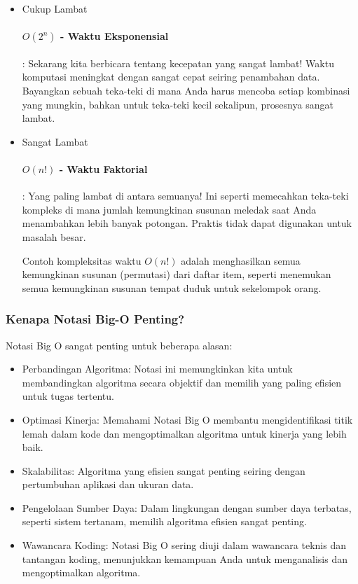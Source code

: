 \documentclass{article}
\begin{document}
\begin{itemize}
          \paragraph{\(O(n^2)\) - Waktu Kuadrat}: Semakin lambat seiring penambahan data. Seperti memeriksa setiap kombinasi item dalam daftar satu sama lain, tidak ideal untuk daftar besar.
    \item Cukup Lambat


          \paragraph{\(O(2^n)\) - Waktu Eksponensial}: Sekarang kita berbicara tentang kecepatan yang sangat lambat! Waktu komputasi meningkat dengan sangat cepat seiring penambahan data. Bayangkan sebuah teka-teki di mana Anda harus mencoba setiap kombinasi yang mungkin, bahkan untuk teka-teki kecil sekalipun, prosesnya sangat lambat.
    \item Sangat Lambat

          \paragraph{\(O(n!)\) - Waktu Faktorial}: Yang paling lambat di antara semuanya! Ini seperti memecahkan teka-teki kompleks di mana jumlah kemungkinan susunan meledak saat Anda menambahkan lebih banyak potongan. Praktis tidak dapat digunakan untuk masalah besar.

          Contoh kompleksitas waktu \(O(n!)\) adalah menghasilkan semua kemungkinan susunan (permutasi) dari daftar item, seperti menemukan semua kemungkinan susunan tempat duduk untuk sekelompok orang.
\end{itemize}

\subsubsection{Kenapa Notasi Big-O Penting?}
Notasi Big O sangat penting untuk beberapa alasan:
\begin{itemize}
    \item Perbandingan Algoritma: Notasi ini memungkinkan kita untuk membandingkan algoritma secara objektif dan memilih yang paling efisien untuk tugas tertentu.
    \item Optimasi Kinerja: Memahami Notasi Big O membantu mengidentifikasi titik lemah dalam kode dan mengoptimalkan algoritma untuk kinerja yang lebih baik.
    \item Skalabilitas: Algoritma yang efisien sangat penting seiring dengan pertumbuhan aplikasi dan ukuran data.
    \item Pengelolaan Sumber Daya: Dalam lingkungan dengan sumber daya terbatas, seperti sistem tertanam, memilih algoritma efisien sangat penting.
    \item Wawancara Koding: Notasi Big O sering diuji dalam wawancara teknis dan tantangan koding, menunjukkan kemampuan Anda untuk menganalisis dan mengoptimalkan algoritma.
\end{itemize}
\end{document}
